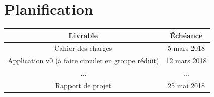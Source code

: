 \documentclass[a4paper, 11pt, titlepage, oneside]{report}
\begin{document}
	\section{Planification}
	
	\begin{center}
		\begin{tabular}{|c|c|}
			\hline
			\textbf{Livrable} & \textbf{Échéance} \\
			\hline
			Cahier des charges & 5 mars 2018 \\
			Application v0 (à faire circuler en groupe réduit) & 12 mars 2018 \\
			... & ... \\
			Rapport de projet & 25 mai 2018 \\
			\hline
			
		\end{tabular}
	\end{center}
\end{document}
